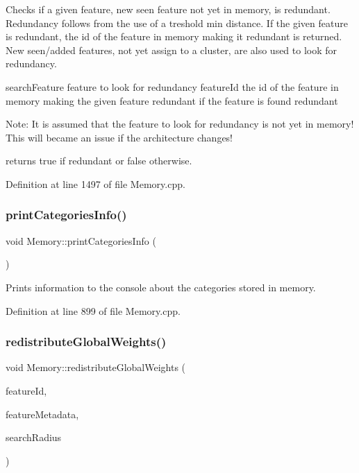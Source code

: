 Checks if a given feature, new seen feature not yet in memory, is redundant. Redundancy follows from the use of a treshold min distance. If the given feature is redundant, the id of the feature in memory making it redundant is returned. New seen/added features, not yet assign to a cluster, are also used to look for redundancy.

search\+Feature feature to look for redundancy feature\+Id the id of the feature in memory making the given feature redundant if the feature is found redundant

Note\+: It is assumed that the feature to look for redundancy is not yet in memory! This will became an issue if the architecture changes!

returns true if redundant or false otherwise. 

Definition at line 1497 of file Memory.\+cpp.

\mbox{\label{class_memory_aeee28733d4a736e1c37a373405a532d4}} 
\subsubsection{\texorpdfstring{print\+Categories\+Info()}{printCategoriesInfo()}}
{\footnotesize\ttfamily void Memory\+::print\+Categories\+Info (\begin{DoxyParamCaption}{ }\end{DoxyParamCaption})}

Prints information to the console about the categories stored in memory. 

Definition at line 899 of file Memory.\+cpp.

\mbox{\label{class_memory_a8b6338bb727061f8c55e0e5df04204d4}} 
\subsubsection{\texorpdfstring{redistribute\+Global\+Weights()}{redistributeGlobalWeights()}\hspace{0.1cm}{\footnotesize\ttfamily [1/2]}}
{\footnotesize\ttfamily void Memory\+::redistribute\+Global\+Weights (\begin{DoxyParamCaption}\item[{int}]{feature\+Id,  }\item[{\hyperlink{class_feature_metadata}{Feature\+Metadata} \&}]{feature\+Metadata,  }\item[{double}]{search\+Radius }\end{DoxyParamCaption})\hspace{0.3cm}{\ttfamily [protected]}}

